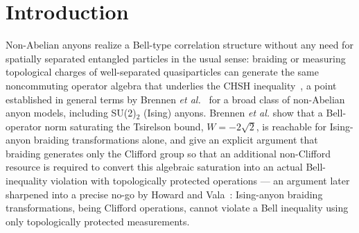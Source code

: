 \documentclass[aps,pra,twocolumn,superscriptaddress,floatfix,nofootinbib]{revtex4-2}
\begin{document}

\maketitle

\section{Introduction}
\label{sec:intro}

Non-Abelian anyons realize a Bell-type correlation structure without
any need for spatially separated entangled particles in the usual
sense: braiding or measuring topological charges of well-separated
quasiparticles can generate the same noncommuting operator algebra
that underlies the CHSH inequality~\cite{CHSH1969,Cirelson1980}, a
point established in general terms by Brennen \emph{et
al.}~\cite{Brennen2009} for a broad class of non-Abelian anyon models,
including SU(2)$_2$ (Ising) anyons. Brennen \emph{et al.} show that a
Bell-operator norm saturating the Tsirelson bound,
$W=-2\sqrt2$, is reachable for Ising-anyon braiding transformations
alone, and give an explicit argument that braiding generates only the
Clifford group so that an additional non-Clifford resource is required
to convert this algebraic saturation into an actual Bell-inequality
violation with topologically protected operations --- an argument later
sharpened into a precise no-go by Howard and
Vala~\cite{HowardVala2012}: Ising-anyon braiding transformations,
being Clifford operations, cannot violate a Bell inequality using only
topologically protected measurements.
\end{document}
